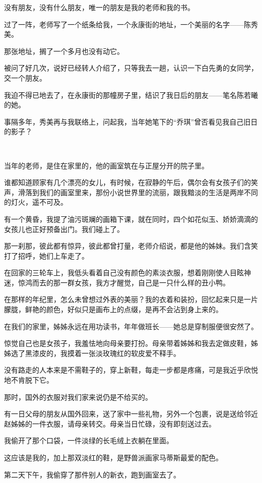 \par 没有朋友，没有什么朋友，唯一的朋友是我的老师和我的书。
\par 过了一阵，老师写了一个纸条给我，一个永康街的地址，一个美丽的名字——陈秀美。
\par 那张地址，搁了一个多月也没有动它。
\par 被问了好几次，说好已经转人介绍了，只等我去一趟，认识一下白先勇的女同学，交一个朋友。
\par 我迫不得已地去了，在永康街的那幢房子里，结识了我日后的朋友——笔名陈若曦的她。
\par 事隔多年，秀美再与我联络上，问起我，当年她笔下的“乔琪”曾否看见我自己旧日的影子？
\par  
\par 当年的老师，是住在家里的，他的画室筑在与正屋分开的院子里。
\par 谁都知道顾家有几个漂亮的女儿，有时候，在寂静的午后，偶尔会有女孩子们的笑声，滑落到我们的画室里来，那份小说世界里的流丽，跟我黯淡的生活是两岸不同的灯火，遥不可及。
\par 有一个黄昏，我提了油污斑斓的画箱下课，就在同时，四个如花似玉、娇娇滴滴的女孩儿也正好预备出门。我们碰上了。
\par 那一刹那，彼此都有惊异，彼此都曾打量，老师介绍说，都是他的姊妹。我们含笑打了招呼，她们上车走了。
\par 在回家的三轮车上，我低头看着自己没有颜色的素淡衣服，想着刚刚使人目眩神迷，惊鸿而去的那一群女孩，我方才醒觉，自己是一只什么样的丑小鸭。
\par 在那样的年纪里，怎么未曾想过外表的美丽？我的衣着和装扮，回忆起来只是一片朦胧，鲜艳的颜色，好似只是画布上的点缀，是再不会沾到身上来的。
\par 在我们的家里，姊姊永远在用功读书，年年做班长——她总是穿制服便很安然了。
\par 惊觉自己也是女孩子，我羞怯地向母亲要打扮。母亲带着姊姊和我去定做皮鞋，姊姊选了黑漆皮的，我摸着一张淡玫瑰红的软皮爱不释手。
\par 没有路走的人本来是不需鞋子的，穿上新鞋，每走一步都是疼痛，可是我近乎欣悦地不肯脱下它。
\par 那时，国外的衣服对我们家来说仍是不给买的。
\par 有一日父母的朋友从国外回来，送了家中一些礼物，另外一个包裹，说是送给邻近赵姊姊的一件衣服，请母亲转交。母亲当日忙碌，没有即刻送过去。
\par 我偷开了那个口袋，一件淡绿的长毛绒上衣躺在里面。
\par 这应该是我的，加上那双淡红的鞋，是野兽派画家马蒂斯最爱的配色。
\par 第二天下午，我偷穿了那件别人的新衣，跑到画室去了。
